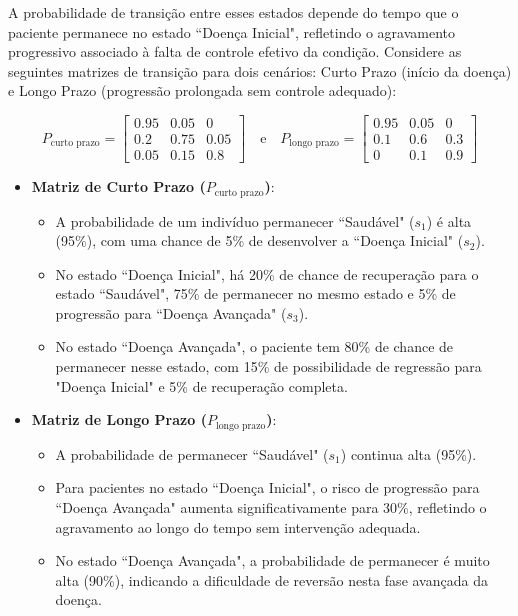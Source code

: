 \documentclass[12pt, a4paper, openany]{book}
\numberwithin{equation}{chapter}
\numberwithin{table}{chapter}
\numberwithin{figure}{chapter}
\theoremstyle{break}
\begin{document}
A probabilidade de transição entre esses estados depende do tempo que o paciente permanece no estado ``Doença Inicial", refletindo o agravamento progressivo associado à falta de controle efetivo da condição. Considere as seguintes matrizes de transição para dois cenários: Curto Prazo (início da doença) e Longo Prazo (progressão prolongada sem controle adequado):

\[
P_{\text{curto prazo}} = \begin{bmatrix} 0.95 & 0.05 & 0 \\ 0.2 & 0.75 & 0.05 \\ 0.05 & 0.15 & 0.8 \end{bmatrix} 
\quad \text{e} \quad 
P_{\text{longo prazo}} = \begin{bmatrix} 0.95 & 0.05 & 0 \\ 0.1 & 0.6 & 0.3 \\ 0 & 0.1 & 0.9 \end{bmatrix}
\]

\begin{itemize}
    \item \textbf{Matriz de Curto Prazo (\( P_{\text{curto prazo}} \))}:
    \begin{itemize}
        \item A probabilidade de um indivíduo permanecer ``Saudável" (\( s_1 \)) é alta (95\%), com uma chance de 5\% de desenvolver a ``Doença Inicial" (\( s_2 \)).
        \item No estado ``Doença Inicial", há 20\% de chance de recuperação para o estado ``Saudável", 75\% de permanecer no mesmo estado e 5\% de progressão para ``Doença Avançada" (\( s_3 \)).
        \item No estado ``Doença Avançada", o paciente tem 80\% de chance de permanecer nesse estado, com 15\% de possibilidade de regressão para "Doença Inicial" e 5\% de recuperação completa.
    \end{itemize}
    \item \textbf{Matriz de Longo Prazo (\( P_{\text{longo prazo}} \))}:
    \begin{itemize}
        \item A probabilidade de permanecer ``Saudável" (\( s_1 \)) continua alta (95\%).
        \item Para pacientes no estado ``Doença Inicial", o risco de progressão para ``Doença Avançada" aumenta significativamente para 30\%, refletindo o agravamento ao longo do tempo sem intervenção adequada.
        \item No estado ``Doença Avançada", a probabilidade de permanecer é muito alta (90\%), indicando a dificuldade de reversão nesta fase avançada da doença.
    \end{itemize}
\end{itemize}
\end{document}
